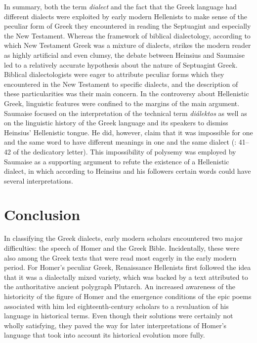 In summary, both the term \textit{dialect} and the fact that the Greek language had different dialects were exploited by early modern Hellenists to make sense of the peculiar form of Greek they encountered in reading the Septuagint and especially the New Testament. Whereas the framework of biblical dialectology, according to which New Testament Greek was a mixture of dialects, strikes the modern reader as highly artificial and even clumsy, the debate between Heinsius and Saumaise led to a relatively accurate hypothesis about the nature of Septuagint Greek. Biblical dialectologists were eager to attribute peculiar forms which they encountered in the New Testament to specific dialects, and the description of these particularities was their main concern. In the controversy about Hellenistic Greek, linguistic features were confined to the margins of the main argument. Saumaise focused on the interpretation of the technical term \textit{diálektos} as well as on the linguistic history of the Greek language and its speakers to dismiss Heinsius’ Hellenistic tongue. He did, however, claim that it was impossible for one and the same word to have different meanings in one and the same dialect (\citealt{Saumaise1643a}: 41–42 of the dedicatory letter). This impossibility of polysemy was employed by Saumaise as a supporting argument to refute the existence of a Hellenistic dialect, in which according to Heinsius and his followers certain words could have several interpretations.

\section{Conclusion}\label{sec:4.7}

In classifying the Greek dialects, early modern scholars encountered two major difficulties: the speech of Homer and the Greek Bible. Incidentally, these were also among the Greek texts that were read most eagerly in the early modern period. For Homer’s peculiar Greek, Renaissance Hellenists first followed the idea that it was a dialectally mixed variety, which was backed by a text attributed to the authoritative ancient polygraph Plutarch. An increased awareness of the historicity of the figure of Homer and the emergence conditions of the epic poems associated with him led eighteenth-century scholars to a revaluation of his language in historical terms. Even though their solutions were certainly not wholly satisfying, they paved the way for later interpretations of Homer’s language that took into account its historical evolution more fully.


